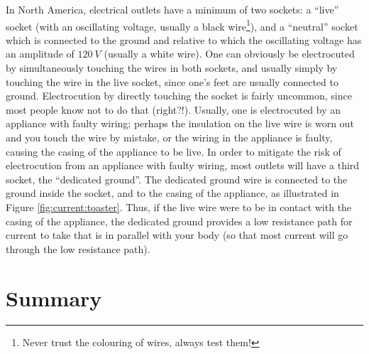 In North America, electrical outlets have a minimum of two sockets: a ``live'' socket (with an oscillating voltage, usually a black wire\footnote{Never trust the colouring of wires, always test them!}), and a ``neutral'' socket which is connected to the ground and relative to which the oscillating voltage has an amplitude of $\SI{120}{V}$ (usually a white wire). One can obviously be electrocuted by simultaneously touching the wires in both sockets, and usually simply by touching the wire in the live socket, since one's feet are usually connected to ground. Electrocution by directly touching the socket is fairly uncommon, since most people know not to do that (right?!). Usually, one is electrocuted by an appliance with faulty wiring; perhaps the insulation on the live wire is worn out and you touch the wire by mistake, or the wiring in the appliance is faulty, causing the casing of the appliance to be live. In order to mitigate the risk of electrocution from an appliance with faulty wiring, most outlets will have a third socket, the ``dedicated ground''. The dedicated ground wire is connected to the ground inside the socket, and to the casing of the appliance, as illustrated in Figure \ref{fig:current:toaster}. Thus, if the live wire were to be in contact with the casing of the appliance, the dedicated ground provides a low resistance path for current to take that is in parallel with your body (so that most current will go through the low resistance path). 

\newpage
\section{Summary}

